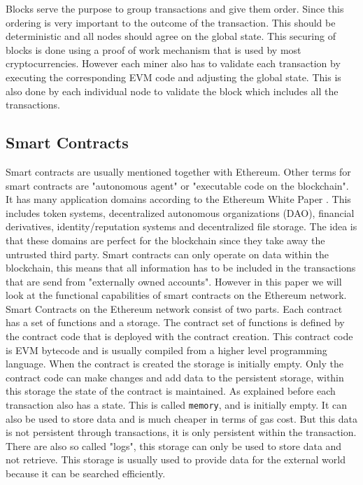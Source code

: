 \documentclass[a4paper]{article}
\begin{document}
Blocks serve the purpose to group transactions and give them order. Since this ordering is very important to the outcome of the transaction. This should be deterministic and all nodes should agree on the global state. This securing of blocks is done using a proof of work mechanism that is used by most cryptocurrencies. However each miner also has to validate each transaction by executing the corresponding EVM code and adjusting the global state. This is also done by each individual node to validate the block which includes all the transactions.

\subsection{Smart Contracts}
Smart contracts are usually mentioned together with Ethereum. Other terms for smart contracts are "autonomous agent" or "executable code on the blockchain". It has many application domains according to the Ethereum White Paper \cite{buterin2013ethereum}. This includes token systems, decentralized autonomous organizations (DAO), financial derivatives, identity/reputation systems and decentralized file storage. The idea is that these domains are perfect for the blockchain since they take away the untrusted third party. Smart contracts can only operate on data within the blockchain, this means that all information has to be included in the transactions that are send from "externally owned accounts". However in this paper we will look at the functional capabilities of smart contracts on the Ethereum network. \\ 
Smart Contracts on the Ethereum network consist of two parts. Each contract has a set of functions and a storage. The contract set of functions is defined by the contract code that is deployed with the contract creation. This contract code is EVM bytecode and is usually compiled from a higher level programming language. When the contract is created the storage is initially empty. Only the contract code can make changes and add data to the persistent storage, within this storage the state of the contract is maintained. As explained before each transaction also has a state. This is called \texttt{memory}, and is initially empty. It can also be used to store data and is much cheaper in terms of gas cost. But this data is not persistent through transactions, it is only persistent within the transaction. There are also so called "logs", this storage can only be used to store data and not retrieve. This storage is usually used to provide data for the external world because it can be searched efficiently.\\
\end{document}
